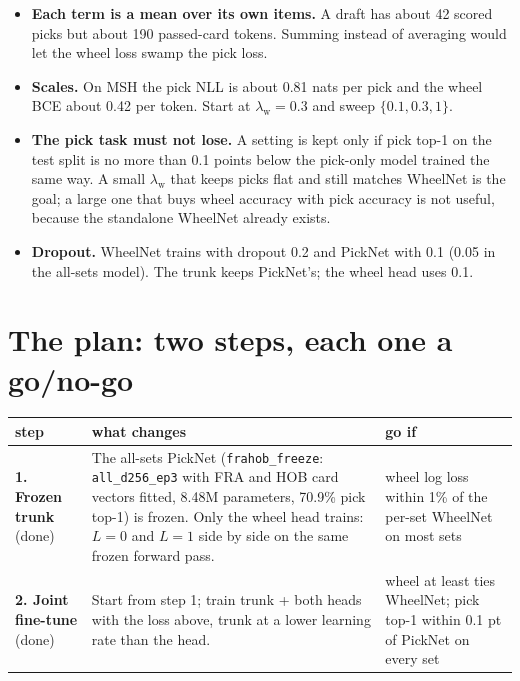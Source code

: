\documentclass[11pt,letterpaper]{article}
\newcommand{\code}[1]{\texttt{\small #1}}
\begin{document}
\begin{itemize}
\item \textbf{Each term is a mean over its own items.} A draft has about 42 scored picks but about 190
passed-card tokens. Summing instead of averaging would let the wheel loss swamp the pick loss.
\item \textbf{Scales.} On MSH the pick NLL is about 0.81 nats per pick and the wheel BCE about 0.42 per
token. Start at $\lambda_{\text{w}}=0.3$ and sweep $\{0.1, 0.3, 1\}$.
\item \textbf{The pick task must not lose.} A setting is kept only if pick top-1 on the test split is no
more than 0.1 points below the pick-only model trained the same way. A small $\lambda_{\text{w}}$ that keeps
picks flat and still matches WheelNet is the goal; a large one that buys wheel accuracy with pick accuracy
is not useful, because the standalone WheelNet already exists.
\item \textbf{Dropout.} WheelNet trains with dropout 0.2 and PickNet with 0.1 (0.05 in the all-sets
model). The trunk keeps PickNet's; the wheel head uses 0.1.
\end{itemize}

\section{The plan: two steps, each one a go/no-go}\label{sec:plan}

\begin{center}\small
\begin{tabular}{p{3.0cm}p{6.6cm}p{4.6cm}}
\toprule
step & what changes & go if \\
\midrule
\textbf{1. Frozen trunk} (done) & The all-sets PickNet (\code{frahob\_freeze}: \code{all\_d256\_ep3} with FRA
and HOB card vectors fitted, 8.48M parameters, 70.9\% pick top-1) is frozen. Only the wheel head trains: $L=0$
and $L=1$ side by side on the same frozen forward pass. &
wheel log loss within 1\% of the per-set WheelNet on most sets \\
\textbf{2. Joint fine-tune} (done) & Start from step 1; train trunk + both heads with the loss above, trunk at a
lower learning rate than the head. &
wheel at least ties WheelNet; pick top-1 within 0.1 pt of PickNet on every set \\
\bottomrule
\end{tabular}
\end{center}
\end{document}
